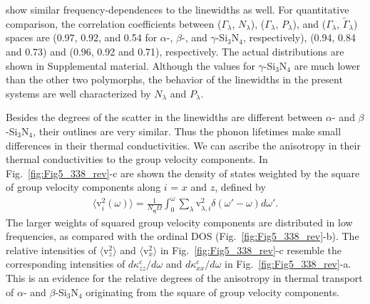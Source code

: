 \documentclass[twocolumn,amsmath,amssymb,a4paper,prb,superscriptaddress,floatfix]{revtex4-1}
\begin{document}
show similar frequency-dependences to the linewidths as well. 
For quantitative comparison, the correlation coefficients between
($\Gamma_\lambda$, $N_\lambda$), ($\Gamma_\lambda$, $P_\lambda$), and
($\Gamma_\lambda$, $\tilde{\Gamma}_\lambda$) spaces are (0.97, 0.92, and 0.54 for
$\alpha$-, $\beta$-, and $\gamma$-Si$_3$N$_4$, respectively), (0.94, 0.84 and
0.73) and (0.96, 0.92 and 0.71), respectively. The actual distributions are
shown in Supplemental material. 
Although the values for $\gamma$-Si$_3$N$_4$ are much lower
than the other two polymorphs, the behavior of the linewidths in the present
systems are well characterized by $N_\lambda$ and $P_\lambda$. 

Besides the degrees of the scatter in the linewidths are different between
$\alpha$- and $\beta$-Si$_3$N$_4$, their outlines are very
similar.
Thus the phonon lifetimes make small differences in their thermal conductivities. 
We can ascribe the anisotropy in their thermal conductivities to the group
velocity components. In Fig.~\ref{fig:Fig5_338_rev}-c are shown the density of
states weighted by the square of group velocity components along $i$ = $x$ and
$z$, defined by 
\begin{align}
 \label{eq:v2dos}
 \langle\text{v}^2_i(\omega)\rangle = \frac{1}{N_\mathbf{q}\Omega}
 \int_0^\omega \sum_\lambda
 \text{v}_{\lambda,i}^2\delta(\omega'-\omega)d\omega'.
\end{align}
The larger weights of squared group velocity components are distributed in low
frequencies, as compared with the ordinal DOS (Fig.~\ref{fig:Fig5_338_rev}-b).
The relative intensities of $\langle\text{v}^2_z\rangle$ and
$\langle\text{v}^2_x\rangle$ in Fig.~\ref{fig:Fig5_338_rev}-c resemble the
corresponding intensities of $d\kappa^\text{c}_{zz}/d\omega$ and
$d\kappa^\text{c}_{xx}/d\omega$ in Fig.~\ref{fig:Fig5_338_rev}-a. This is an
evidence for the relative degrees of the anisotropy in thermal transport of
$\alpha$- and $\beta$-Si$_3$N$_4$ originating from the square of group velocity
components.
\end{document}
